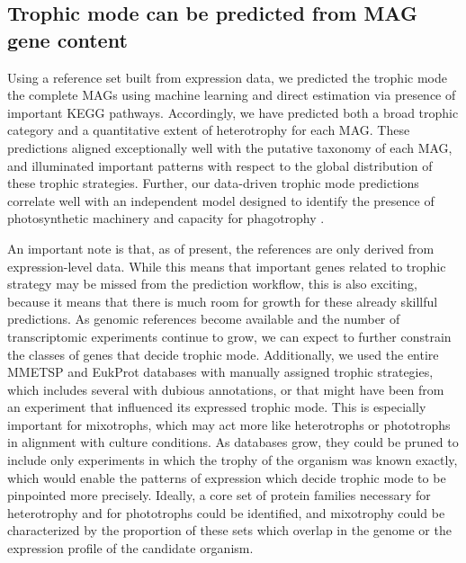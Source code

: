 \documentclass[12pt]{article}
\numberwithin{equation}{section}
\begin{document}
\subsection*{Trophic mode can be predicted from MAG gene content}

Using a reference set built from expression data, we predicted the trophic mode the complete MAGs using machine learning and direct estimation via presence of important KEGG pathways. Accordingly, we have predicted both a broad trophic category and a quantitative extent of heterotrophy for each MAG. These predictions aligned exceptionally well with the putative taxonomy of each MAG, and illuminated important patterns with respect to the global distribution of these trophic strategies. Further, our data-driven trophic mode predictions correlate well with an independent model designed to identify the presence of photosynthetic machinery and capacity for phagotrophy \citep{burns2018gene}.

An important note is that, as of present, the references are only derived from expression-level data. While this means that important genes related to trophic strategy may be missed from the prediction workflow, this is also exciting, because it means that there is much room for growth for these already skillful predictions. As genomic references become available and the number of transcriptomic experiments continue to grow, we can expect to further constrain the classes of genes that decide trophic mode. Additionally, we used the entire MMETSP and EukProt databases with manually assigned trophic strategies, which includes several with dubious annotations, or that might have been from an experiment that influenced its expressed trophic mode. This is especially important for mixotrophs, which may act more like heterotrophs or phototrophs in alignment with culture conditions. As databases grow, they could be pruned to include only experiments in which the trophy of the organism was known exactly, which would enable the patterns of expression which decide trophic mode to be  pinpointed more precisely. Ideally, a core set of protein families necessary for heterotrophy and for phototrophs could be identified, and mixotrophy could be characterized by the proportion of these sets which overlap in the genome or the expression profile of the candidate organism.
\end{document}
